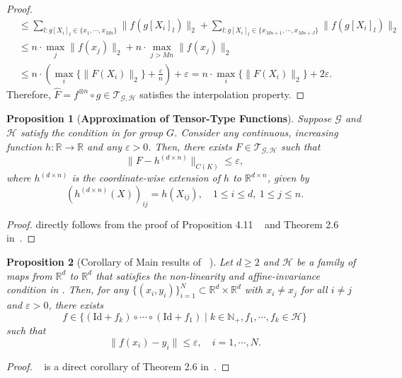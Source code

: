\documentclass{article}
\newtheorem{proposition}{Proposition}
\begin{document}
\begin{proof}
\begin{equation}
\begin{aligned}
        &\le \sum_{l: g[X_i]_l\in \{x_1,\cdots, x_{Mn}\}}\|f(g[X_i]_l)\|_2 + \sum_{l: g[X_i]_l\in \{x_{Mn+1},\cdots, x_{Mn+J}\}}\|f(g[X_i]_l)\|_2\\
        &\le n\cdot \max_{j}\|f(x_j)\|_2 + n\cdot \max_{j>Mn}\|f(x_j)\|_2\\
        & \le n\cdot \left(\max_{i}\{\|F(X_i)\|_2\}+\frac{\varepsilon}{n} \right) + \varepsilon = n\cdot \max_{i}\{\|F(X_i)\|_2\} + 2\varepsilon.
        \end{aligned}
\end{equation}
Therefore, $\hat F=f^{\otimes n}\circ g \in \mathcal T_{\mathcal G, \mathcal H}$ satisfies the interpolation property.
\end{proof}

\begin{proposition}[\textbf{Approximation of Tensor-Type Functions}]
    \label{prop:tensor_type_approx}
    Suppose $\mathcal G$ and $\mathcal H$ satisfy the condition in  for group $G$.
    Consider any continuous, increasing function $h:\mathbb{R}\to\mathbb{R}$ and any $\varepsilon > 0$.
    Then, there exists $F\in\mathcal{T}_{\mathcal{G}, \mathcal{H}}$ such that
    \begin{equation}
        \|F-h^{(d\times n)}\|_{C(K)}\leq \varepsilon,
    \end{equation}
    where $h^{(d\times n)}$ is the coordinate-wise extension of $h$ to $\mathbb{R}^{d\times n}$, given by
    \begin{equation}
        (h^{(d\times n)}(X))_{ij}=h(X_{ij}), \quad 1\leq i\leq d, \ 1\leq j\leq n.
    \end{equation}
\end{proposition}
\begin{proof}
     directly follows from the proof of Proposition 4.11 ~\cite{li2022deep} and Theorem 2.6 in~\cite{cheng2025interpolation}.
\end{proof}

\begin{proposition}[Corollary of Main results of ~\cite{cheng2025interpolation}]
    \label{prop:interpolation_2}
    Let $d\ge 2$ and $\mathcal H$ be a family of maps from $\mathbb R^d$ to $\mathbb R^d$ that satisfies the non-linearity and affine-invariance condition in . Then, for any $  \{(x_i,y_i)\}_{i=1}^N\subset \mathbb R^d\times \mathbb R^d$ with $x_i\neq x_j$ for all $i\neq j$ and $\varepsilon>0$, there exists
    \begin{equation}
    f\in \{(\mathrm{Id}+f_k)\circ \cdots \circ (\mathrm{Id}+f_1)\mid k\in \mathbb N_+,  f_1,\cdots, f_k\in \mathcal H \}
    \end{equation}
    such that
    \begin{equation}
        \|f(x_i)-y_i\|\le \varepsilon, \quad i=1,\cdots, N.
    \end{equation}
\end{proposition}
\begin{proof}
    ~ is a direct corollary of Theorem 2.6 in~\cite{cheng2025interpolation}.
\end{proof}
\end{document}
